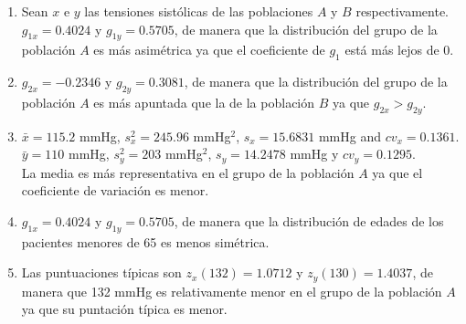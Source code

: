 \begin{solution}
\begin{enumerate}
\item Sean $x$ e $y$ las tensiones sistólicas de las poblaciones $A$ y $B$ respectivamente.\\
$g_{1x}=0.4024$ y $g_{1y}=0.5705$, de manera que la distribución del grupo de la población $A$ es más asimétrica ya que el coeficiente de $g_1$ está más lejos de 0.
\item $g_{2x}=-0.2346$ y $g_{2y}=0.3081$, de manera que la distribución del grupo de la población $A$ es más apuntada que la de la población $B$ ya que $g_{2x}>g_{2y}$.
\item $\bar x=115.2$ mmHg, $s_x^2=245.96$ mmHg$^2$, $s_x=15.6831$ mmHg and $cv_x=0.1361$.\\
$\bar y=110$ mmHg, $s_y^2=203$ mmHg$^2$, $s_y=14.2478$ mmHg y $cv_y=0.1295$.\\
La media es más representativa en el grupo de la población $A$ ya que el coeficiente de variación es menor.
\item $g_{1x}=0.4024$ y $g_{1y}=0.5705$, de manera que la distribución de edades de los pacientes menores de 65 es menos simétrica.
\item Las puntuaciones típicas son $z_x(132)=1.0712$ y $z_y(130)=1.4037$, de manera que 132 mmHg es relativamente menor en el grupo de la población $A$ ya que su puntación típica es menor.
\end{enumerate}
\end{solution}

 

